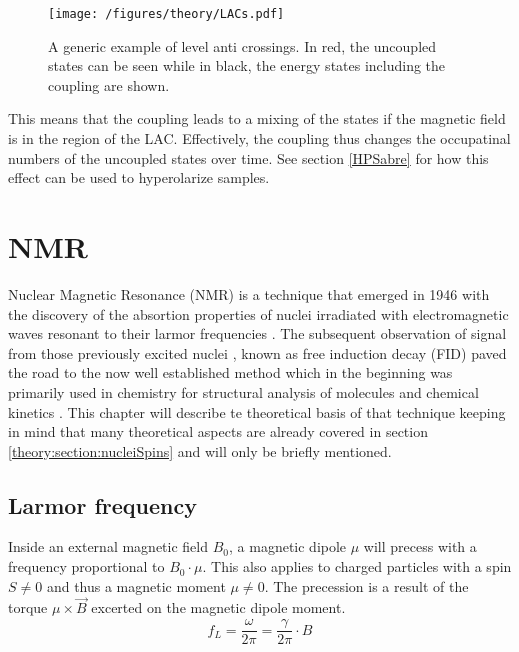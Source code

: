             \begin{figure}
                \centering
                \texttt{[image: /figures/theory/LACs.pdf]}
                \caption[Leval anti crossings]{A generic example of level anti crossings. In red, the uncoupled states can be seen while in black, the energy states including the coupling are shown.}
                \label{figure:theory:LAC}
            \end{figure}
            This means that the coupling leads to a mixing of the states if the magnetic field is in the region of the LAC. Effectively, the coupling thus changes the occupatinal numbers of the uncoupled states over time. See section \ref{HPSabre} for how this effect can be used to hyperolarize samples.
    \section{NMR}
    Nuclear Magnetic Resonance (NMR) is a technique that emerged in 1946 with the discovery of the absortion properties of nuclei irradiated with electromagnetic waves resonant to their larmor frequencies \cite{ResonanceAbsorption}. The subsequent observation of signal from those previously excited nuclei \cite{rabi_space_1937,purcell_resonance_1946-1,bloch_nuclear_1946}, known as free induction decay (FID) paved the road to the now well established method which in the beginning was primarily used in chemistry for structural analysis of molecules and chemical kinetics \cite{perrin_application_1990,lipkind_computer-assisted_1988}. This chapter will describe te theoretical basis of that technique keeping in mind that many theoretical aspects are already covered in section \ref{theory:section:nucleiSpins} and will only be briefly mentioned. 
        \subsection{Larmor frequency}
        \label{section:theory:larmorFrequency}
            Inside an external magnetic field $B_0$, a magnetic dipole $\mu$ will precess with a frequency
            proportional to $B_0\cdot \mu$. This also applies to charged particles with a spin $S\neq0$ and thus
            a magnetic moment $\mu\neq0$. The precession is a result of the torque $\mu\times\vec B$
            excerted on the magnetic dipole moment.
            \begin{equation}
                f_L=\frac{\omega}{2\pi} = \frac{\gamma}{2\pi}\cdot B
            \end{equation}
